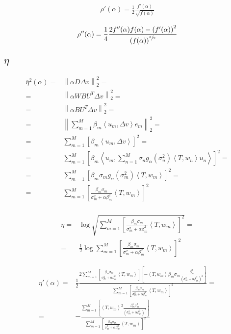 \documentclass[a4paper,10pt]{article}
\theoremstyle{plain}
\theoremstyle{definition}
\theoremstyle{remark}
\newcommand{\obar}[1]{\overline{#1}}
\newcommand{\pa}[1]{\left(#1\right)}
\newcommand{\ang}[1]{\left<#1\right>}
\newcommand{\bra}[1]{\left[#1\right]}
\newcommand{\norm}[1]{\left\|#1\right\|}
\begin{document}
\begin{align*}
  \rho '(\alpha) = \frac{1}{2} \frac{f'(\alpha)}{\sqrt{f(\alpha)}}
\end{align*}

\begin{align*}
  \rho ''(\alpha) = \frac{1}{4} \frac{2 f''(\alpha) f(\alpha) - \pa{
      f'(\alpha)} ^2 }{\pa{f(\alpha)} ^{\sfrac{3}{2}}}
\end{align*}

\subsection{$\eta$}

\begin{align*}
  \obar{\eta}^2(\alpha ) = & \norm{ \alpha D \Delta v } _2 ^2 =  \\
  = & \norm{ \alpha WBU^T \Delta v } _2 ^2 =\\
  = & \norm{ \alpha B U^T \Delta v } _2 ^2 =\\
  = & \norm{ \sum _{m=1} ^M \beta _m \ang{ u_m , \Delta v} e_m } _2 ^2
  = \\
  = & \sum _{m=1} ^M \bra{ \beta _m \ang{ u_m , \Delta v} } ^2 = \\
  = & \sum _{m=1} ^M \bra{ \beta _m \ang{ u_m , \sum _{n=1} ^M \sigma
      _n g_\alpha \pa{\sigma_n ^2 } \ang{T,w_n} u_n} } ^2 = \\
  = & \sum _{m=1} ^M \bra{ \beta _m \sigma
    _m g_\alpha \pa{\sigma_m ^2 } \ang{T,w_m}  } ^2 = \\
  = & \sum _{m=1} ^M \bra{ \frac{ \beta _m \sigma
    _m}{\sigma _m ^2 + \alpha \beta _m ^2}  \ang{T,w_m}  } ^2 \\
\end{align*}

\begin{align*}
  \eta = & \log \sqrt{ \sum _{m=1} ^M \bra{ \frac{ \beta _m \sigma
        _m}{\sigma _m ^2 + \alpha \beta _m ^2} \ang{T,w_m} } ^2 } =
  \\
  = & \frac{1}{2} \log \sum _{m=1} ^M \bra{ \frac{ \beta _m \sigma
      _m}{\sigma _m ^2 + \alpha \beta _m ^2} \ang{T,w_m} } ^2
\end{align*}

\begin{align*}
  \eta ' (\alpha) = & \frac{1}{2} \frac{2 \sum _{m=1} ^M \bra{\frac{
        \beta _m \sigma _m}{\sigma _m ^2 + \alpha \beta _m ^2}
      \ang{T,w_m}}\bra{- \ang{T,w_m} \beta _m \sigma _m \frac{\beta_m
        ^2}{\pa{ \sigma _m ^2 + \alpha \beta _m ^2} ^{2} }} }{ \sum
    _{m=1} ^M \bra{ \frac{ \beta _m \sigma _m}{\sigma _m ^2 +
        \alpha \beta _m ^2} \ang{T,w_m} } ^2} = \\
  = & - \frac{ \sum _{m=1} ^M \bra{\ang{T,w_m}^2 \frac{ \beta _m ^4
        \sigma _m ^2 }{\pa{\sigma _m ^2 + \alpha \beta _m ^2} ^3 } }}
  { \sum _{m=1} ^M \bra{ \frac{ \beta _m \sigma _m}{\sigma _m ^2 +
        \alpha \beta _m ^2} \ang{T,w_m} } ^2} \\
\end{align*}
\end{document}
